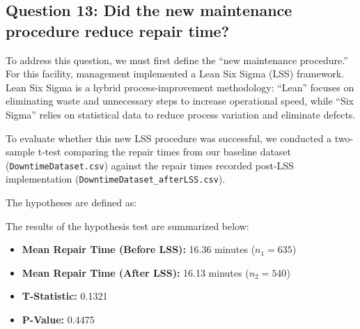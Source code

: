 \subsection*{Question 13: Did the new maintenance procedure reduce repair time?}

To address this question, we must first define the ``new maintenance procedure.'' For this facility, management implemented a Lean Six Sigma (LSS) framework. Lean Six Sigma is a hybrid process-improvement methodology: ``Lean'' focuses on eliminating waste and unnecessary steps to increase operational speed, while ``Six Sigma'' relies on statistical data to reduce process variation and eliminate defects. 

To evaluate whether this new LSS procedure was successful, we conducted a two-sample t-test comparing the repair times from our baseline dataset (\texttt{DowntimeDataset.csv}) against the repair times recorded post-LSS implementation (\texttt{DowntimeDataset\_afterLSS.csv}).

The hypotheses are defined as:

\begin{center}
\end{center}


The results of the hypothesis test are summarized below:
\begin{itemize}
    \item \textbf{Mean Repair Time (Before LSS):} 16.36 minutes ($n_1 = 635$)
    \item \textbf{Mean Repair Time (After LSS):} 16.13 minutes ($n_2 = 540$)
    \item \textbf{T-Statistic:} 0.1321
    \item \textbf{P-Value:} 0.4475
\end{itemize}

